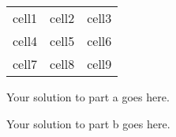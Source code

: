 \documentclass{6042}
\author{Ben Bitdiddle}
\begin{document}

\begin{center}
    \begin{tabular}{ |c|c|c| } 
     \hline
     cell1 & cell2 & cell3 \\ 
     cell4 & cell5 & cell6 \\ 
     cell7 & cell8 & cell9 \\ 
     \hline
    \end{tabular}
\end{center}




Your solution to part a goes here.

Your solution to part b goes here.


\end{document}
